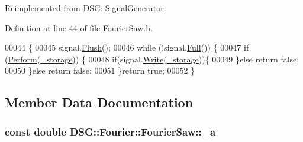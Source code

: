 Reimplemented from \hyperlink{class_d_s_g_1_1_signal_generator_ab050f80e84e6c8b3e354b56930d6a02b}{D\+S\+G\+::\+Signal\+Generator}.



Definition at line \hyperlink{_fourier_saw_8h_source_l00044}{44} of file \hyperlink{_fourier_saw_8h_source}{Fourier\+Saw.\+h}.


\begin{DoxyCode}
00044                                                                       \{
00045             signal.\hyperlink{class_d_s_g_1_1_ring_buffer_ab23c8003d2857809a816068eeb209d60}{Flush}();
00046             \textcolor{keywordflow}{while} (!signal.\hyperlink{class_d_s_g_1_1_ring_buffer_a53ddb04ffcbb5470a8d2b0a3c65b70cb}{Full}()) \{
00047                 \textcolor{keywordflow}{if} (\hyperlink{class_d_s_g_1_1_fourier_1_1_fourier_saw_a33061612ff24180f12e9a2c29dfaa116}{Perform}(\hyperlink{class_d_s_g_1_1_signal_generator_a28a9b47a1aa0783029f11a19ba0363f2}{\_storage})) \{
00048                     \textcolor{keywordflow}{if}(signal.\hyperlink{class_d_s_g_1_1_ring_buffer_aa5dd2caa0a270173251faee40a43d692}{Write}(\hyperlink{class_d_s_g_1_1_signal_generator_a28a9b47a1aa0783029f11a19ba0363f2}{\_storage}))\{
00049                     \}\textcolor{keywordflow}{else} \textcolor{keywordflow}{return} \textcolor{keyword}{false};
00050                 \}\textcolor{keywordflow}{else} \textcolor{keywordflow}{return} \textcolor{keyword}{false};
00051             \}\textcolor{keywordflow}{return} \textcolor{keyword}{true};
00052         \}
\end{DoxyCode}


\subsection{Member Data Documentation}
\hypertarget{class_d_s_g_1_1_fourier_1_1_fourier_saw_a54895160b61b8d84dc967e7815d07869}{
\subsubsection[{\+\_\+a}]{\setlength{\rightskip}{0pt plus 5cm}const double D\+S\+G\+::\+Fourier\+::\+Fourier\+Saw\+::\+\_\+a\hspace{0.3cm}{\ttfamily [protected]}}}\label{class_d_s_g_1_1_fourier_1_1_fourier_saw_a54895160b61b8d84dc967e7815d07869}


